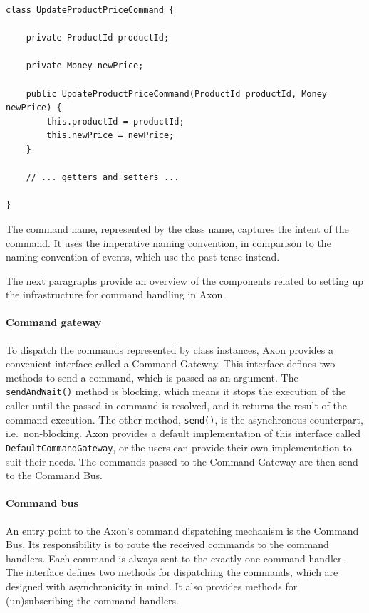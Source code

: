 \documentclass{book}
\begin{document}
\begin{lstlisting}[caption={An example of a command class in Axon},label={lst:priceCommand},captionpos=b,float,floatplacement=H]
class UpdateProductPriceCommand {
    
    private ProductId productId;

    private Money newPrice;

    public UpdateProductPriceCommand(ProductId productId, Money newPrice) {
        this.productId = productId;
        this.newPrice = newPrice;
    }

    // ... getters and setters ...

}
\end{lstlisting}

The command name, represented by the class name, captures the intent of
the command. It uses the imperative naming convention, in comparison to
the naming convention of events, which use the past tense instead.

The next paragraphs provide an overview of the components related to
setting up the infrastructure for command handling in Axon.

\paragraph{Command gateway}\label{command-gateway}

To dispatch the commands represented by class instances, Axon provides a
convenient interface called a Command Gateway. This interface defines
two methods to send a command, which is passed as an argument. The
\texttt{sendAndWait()} method is blocking, which means it stops the
execution of the caller until the passed-in command is resolved, and it
returns the result of the command execution. The other method,
\texttt{send()}, is the asynchronous counterpart, i.e.~non-blocking.
Axon provides a default implementation of this interface called
\texttt{DefaultCommandGateway}, or the users can provide their own
implementation to suit their needs. The commands passed to the Command
Gateway are then send to the Command Bus.

\paragraph{Command bus}\label{command-bus}

An entry point to the Axon's command dispatching mechanism is the
Command Bus. Its responsibility is to route the received commands to the
command handlers. Each command is always sent to the exactly one command
handler. The interface defines two methods for dispatching the commands,
which are designed with asynchronicity in mind. It also provides methods
for (un)subscribing the command handlers.
\end{document}
